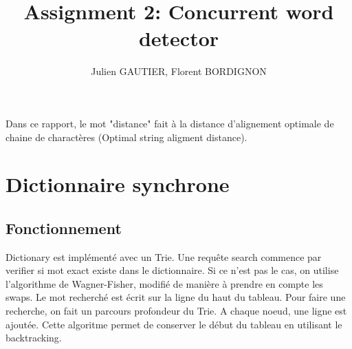\documentclass{article}
\title{Assignment 2: Concurrent word detector}
\author{Julien GAUTIER, Florent BORDIGNON}
\begin{document}
\maketitle
Dans ce rapport, le mot "distance" fait à la distance
d'alignement optimale de chaine de charactères (Optimal string aligment
distance).

\section{Dictionnaire synchrone}
\subsection{Fonctionnement}
Dictionary est implémenté avec un Trie.
Une requête search commence par verifier si mot exact existe dans le dictionnaire. Si ce n'est pas le cas, on utilise l'algorithme de Wagner-Fisher, modifié de manière à prendre en compte les swaps.
Le mot recherché est écrit sur la ligne du haut du tableau.
Pour faire une recherche, on fait un parcours profondeur du Trie. A chaque
noeud, une ligne est ajoutée. Cette algoritme permet de conserver le début du
tableau en utilisant le backtracking.\\


\end{document}
